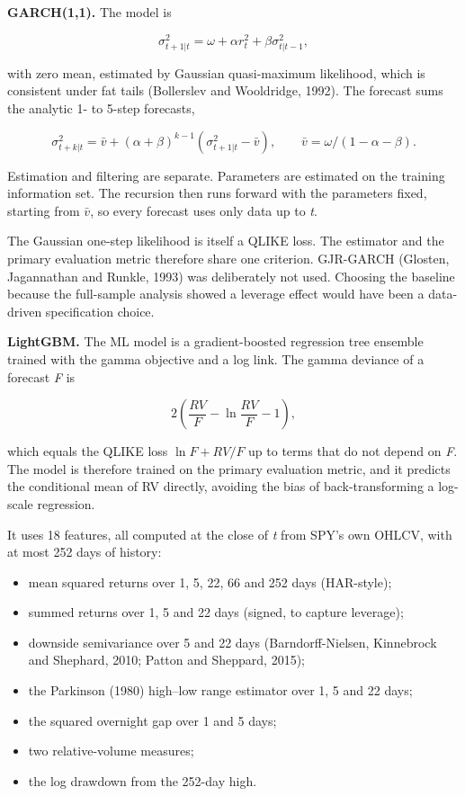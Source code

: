 \documentclass[11pt]{article}
\providecommand{\tightlist}{\setlength{\itemsep}{0pt}\setlength{\parskip}{0pt}}
\begin{document}
\textbf{GARCH(1,1).} The model is

\[\sigma^2_{t+1|t} = \omega + \alpha r_t^2 + \beta \sigma^2_{t|t-1} ,\]

with zero mean, estimated by Gaussian quasi-maximum likelihood, which is
consistent under fat tails (Bollerslev and Wooldridge, 1992). The forecast
sums the analytic 1- to 5-step forecasts,

\[\sigma^2_{t+k|t} = \bar v + (\alpha+\beta)^{k-1}\left(\sigma^2_{t+1|t} - \bar v\right),
\qquad \bar v = \omega / (1-\alpha-\beta).\]

Estimation and filtering are separate. Parameters are estimated on the
training information set. The recursion then runs forward with the
parameters fixed, starting from \(\bar v\), so every forecast uses only data
up to \emph{t}.

The Gaussian one-step likelihood is itself a QLIKE loss. The estimator and
the primary evaluation metric therefore share one criterion. GJR-GARCH
(Glosten, Jagannathan and Runkle, 1993) was deliberately not used. Choosing
the baseline because the full-sample analysis showed a leverage effect
would have been a data-driven specification choice.

\textbf{LightGBM.} The ML model is a gradient-boosted regression tree ensemble
trained with the gamma objective and a log link. The gamma deviance of a
forecast \emph{F} is

\[2\left(\frac{RV}{F} - \ln\frac{RV}{F} - 1\right),\]

which equals the QLIKE loss \(\ln F + RV/F\) up to terms that do not depend
on \emph{F}. The model is therefore trained on the primary evaluation metric,
and it predicts the conditional mean of RV directly, avoiding the bias of
back-transforming a log-scale regression.

It uses 18 features, all computed at the close of \emph{t} from SPY's own
OHLCV, with at most 252 days of history:

\begin{itemize}
\tightlist
\item
  mean squared returns over 1, 5, 22, 66 and 252 days (HAR-style);
\item
  summed returns over 1, 5 and 22 days (signed, to capture leverage);
\item
  downside semivariance over 5 and 22 days (Barndorff-Nielsen, Kinnebrock
  and Shephard, 2010; Patton and Sheppard, 2015);
\item
  the Parkinson (1980) high--low range estimator over 1, 5 and 22 days;
\item
  the squared overnight gap over 1 and 5 days;
\item
  two relative-volume measures;
\item
  the log drawdown from the 252-day high.
\end{itemize}
\end{document}
